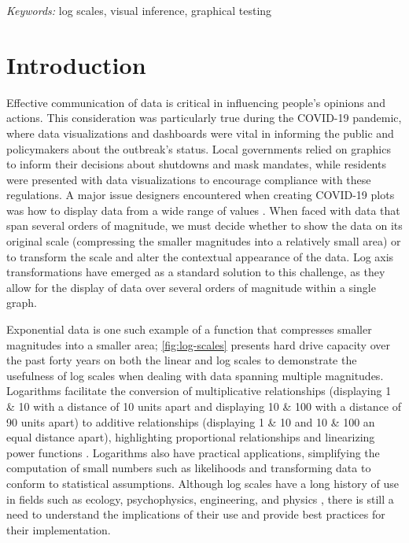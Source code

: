 \documentclass[12pt]{article}
\begin{document}
\noindent%
{\it Keywords:} log scales, visual inference, graphical testing

\vfill

\newpage
{} %

\hypertarget{introduction}{%
\section{Introduction}\label{introduction}}

Effective communication of data is critical in influencing people's
opinions and actions. This consideration was particularly true during
the COVID-19 pandemic, where data visualizations and dashboards were
vital in informing the public and policymakers about the outbreak's
status. Local governments relied on graphics to inform their decisions
about shutdowns and mask mandates, while residents were presented with
data visualizations to encourage compliance with these regulations. A
major issue designers encountered when creating COVID-19 plots was how
to display data from a wide range of values
\citep{fagen-ulmschneider_2020, burnmurdoch_2020}. When faced with data
that span several orders of magnitude, we must decide whether to show
the data on its original scale (compressing the smaller magnitudes into
a relatively small area) or to transform the scale and alter the
contextual appearance of the data. Log axis transformations have emerged
as a standard solution to this challenge, as they allow for the display
of data over several orders of magnitude within a single graph.

Exponential data is one such example of a function that compresses
smaller magnitudes into a smaller area; \cref{fig:log-scales} presents
hard drive capacity over the past forty years on both the linear and log
scales to demonstrate the usefulness of log scales when dealing with
data spanning multiple magnitudes. Logarithms facilitate the conversion
of multiplicative relationships (displaying 1 \& 10 with a distance of
10 units apart and displaying 10 \& 100 with a distance of 90 units
apart) to additive relationships (displaying 1 \& 10 and 10 \& 100 an
equal distance apart), highlighting proportional relationships and
linearizing power functions \citep{menge_logarithmic_2018}. Logarithms
also have practical applications, simplifying the computation of small
numbers such as likelihoods and transforming data to conform to
statistical assumptions. Although log scales have a long history of use
in fields such as ecology, psychophysics, engineering, and physics
\citep{heckler_student_2013, waddell2005comparisons}, there is still a
need to understand the implications of their use and provide best
practices for their implementation.
\end{document}
